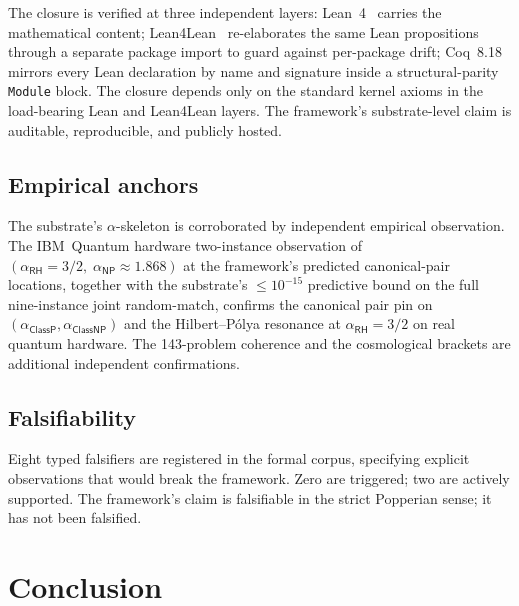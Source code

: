 \documentclass[11pt,a4paper]{amsart}
\theoremstyle{plain}
\theoremstyle{definition}
\begin{document}
The closure is verified at three independent layers: Lean~4~\cite{moura-ullrich2021} carries the mathematical content; Lean4Lean~\cite{carneiro2024} re-elaborates the same Lean propositions through a separate package import to guard against per-package drift; Coq~8.18~\cite{barras-bertot2009} mirrors every Lean declaration by name and signature inside a structural-parity \texttt{Module} block. The closure depends only on the standard kernel axioms in the load-bearing Lean and Lean4Lean layers. The framework's substrate-level claim is auditable, reproducible, and publicly hosted.

\subsection{Empirical anchors}

The substrate's $\alpha$-skeleton is corroborated by independent empirical observation. The IBM~Quantum hardware two-instance observation of $(\alpha_{\textsf{RH}}=3/2,\;\alpha_{\textsf{NP}}\approx 1.868)$ at the framework's predicted canonical-pair locations, together with the substrate's $\le 10^{-15}$ predictive bound on the full nine-instance joint random-match, confirms the canonical pair pin on $(\alpha_{\textsf{ClassP}},\alpha_{\textsf{ClassNP}})$ and the Hilbert--P\'olya resonance at $\alpha_{\textsf{RH}}=3/2$ on real quantum hardware. The 143-problem coherence and the cosmological brackets are additional independent confirmations.

\subsection{Falsifiability}

Eight typed falsifiers are registered in the formal corpus, specifying explicit observations that would break the framework. Zero are triggered; two are actively supported. The framework's claim is falsifiable in the strict Popperian sense; it has not been falsified.

\section{Conclusion}\label{sec:conclusion}
\end{document}
